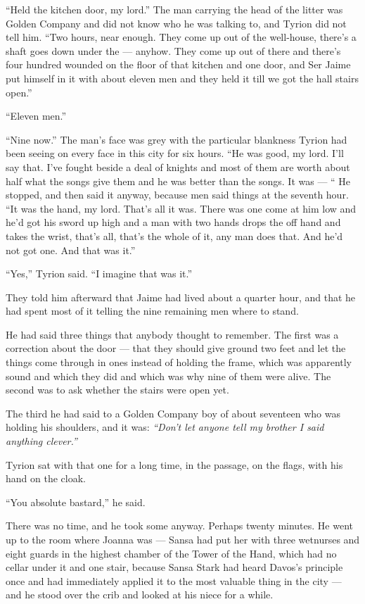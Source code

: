 “Held the kitchen door, my lord.” The man carrying the head of the litter was Golden Company and did not know who he was talking to, and Tyrion did not tell him. “Two hours, near enough. They come up out of the well-house, there’s a shaft goes down under the — anyhow. They come up out of there and there’s four hundred wounded on the floor of that kitchen and one door, and Ser Jaime put himself in it with about eleven men and they held it till we got the hall stairs open.”

“Eleven men.”

“Nine now.” The man’s face was grey with the particular blankness Tyrion had been seeing on every face in this city for six hours. “He was good, my lord. I’ll say that. I’ve fought beside a deal of knights and most of them are worth about half what the songs give them and he was better than the songs. It was — “ He stopped, and then said it anyway, because men said things at the seventh hour. “It was the hand, my lord. That’s all it was. There was one come at him low and he’d got his sword up high and a man with two hands drops the off hand and takes the wrist, that’s all, that’s the whole of it, any man does that. And he’d not got one. And that was it.”

“Yes,” Tyrion said. “I imagine that was it.”

\sceneBreak

They told him afterward that Jaime had lived about a quarter hour, and that he had spent most of it telling the nine remaining men where to stand.

He had said three things that anybody thought to remember. The first was a correction about the door — that they should give ground two feet and let the things come through in ones instead of holding the frame, which was apparently sound and which they did and which was why nine of them were alive. The second was to ask whether the stairs were open yet.

The third he had said to a Golden Company boy of about seventeen who was holding his shoulders, and it was: \textit{“Don’t let anyone tell my brother I said anything clever.”}

Tyrion sat with that one for a long time, in the passage, on the flags, with his hand on the cloak.

“You absolute bastard,” he said.

\sceneBreak

There was no time, and he took some anyway. Perhaps twenty minutes. He went up to the room where Joanna was — Sansa had put her with three wetnurses and eight guards in the highest chamber of the Tower of the Hand, which had no cellar under it and one stair, because Sansa Stark had heard Davos’s principle once and had immediately applied it to the most valuable thing in the city — and he stood over the crib and looked at his niece for a while.

